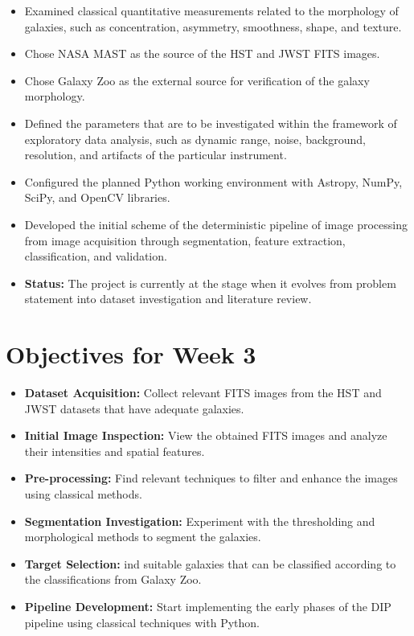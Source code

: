 \documentclass[11pt]{article}
\begin{document}
\begin{itemize}
    \item Examined classical quantitative measurements related to the morphology of galaxies, such as concentration, asymmetry, smoothness, shape, and texture.
    \item Chose NASA MAST as the source of the HST and JWST FITS images.
    \item Chose Galaxy Zoo as the external source for verification of the galaxy morphology.
    \item Defined the parameters that are to be investigated within the framework of exploratory data analysis, such as dynamic range, noise, background, resolution, and artifacts of the particular instrument.
    \item Configured the planned Python working environment with Astropy, NumPy, SciPy, and OpenCV libraries.
    \item Developed the initial scheme of the deterministic pipeline of image processing from image acquisition through segmentation, feature extraction, classification, and validation.
    \item \textbf{Status:} The project is currently at the stage when it evolves from problem statement into dataset investigation and literature review.
\end{itemize}



\section{Objectives for Week 3}

\begin{itemize}
    \item \textbf{Dataset Acquisition:} Collect relevant FITS images from the HST and JWST datasets that have adequate galaxies.
    \item \textbf{Initial Image Inspection:} View the obtained FITS images and analyze their intensities and spatial features.
    \item \textbf{Pre-processing:} Find relevant techniques to filter and enhance the images using classical methods.
    \item \textbf{Segmentation Investigation:} Experiment with the thresholding and morphological methods to segment the
galaxies.
    \item \textbf{Target Selection:} ind suitable galaxies that can be classified according to the classifications from Galaxy
Zoo.
    \item \textbf{Pipeline Development:} Start implementing the early phases of the DIP pipeline using classical techniques
with Python.
\end{itemize}



\end{document}
